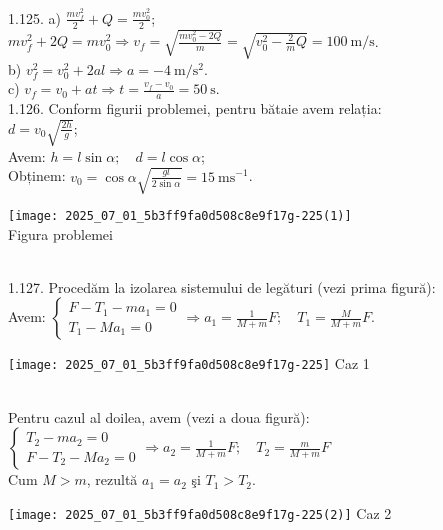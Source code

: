 1.125. a) $\frac{m v_{f}^{2}}{2}+Q=\frac{m v_{0}^{2}}{2}$;\\ $m v_{f}^{2}+2 Q=m v_{0}^{2} \Rightarrow v_{f}=\sqrt{\frac{m v_{0}^{2}-2 Q}{m}}=\sqrt{v_{0}^{2}-\frac{2}{m} Q}=100 \mathrm{~m} / \mathrm{s}$.\\ b) $v_{f}^{2}=v_{0}^{2}+2 a l \Rightarrow a=-4 \mathrm{~m} / \mathrm{s}^{2}$.\\ c) $v_{f}=v_{0}+a t \Rightarrow t=\frac{v_{f}-v_{0}}{a}=50 \mathrm{~s}$.\\

1.126. Conform figurii problemei, pentru bătaie avem relația:\\ $d=v_{0} \sqrt{\frac{2 h}{g}}$;\\ Avem: $h=l \sin \alpha; \quad d=l \cos \alpha$;\\ Obținem: $v_{0}=\cos \alpha \sqrt{\frac{g l}{2 \sin \alpha}}=15 \mathrm{~ms}^{-1}$.\\ \begin{center} \texttt{[image: 2025\_07\_01\_5b3ff9fa0d508c8e9f17g-225(1)]}\\ Figura problemei \end{center}\\

1.127. Procedăm la izolarea sistemului de legături (vezi prima figură):\\ Avem: $\left\{\begin{array}{l}F-T_{1}-m a_{1}=0 \\ T_{1}-M a_{1}=0\end{array} \Rightarrow a_{1}=\frac{1}{M+m} F; \quad T_{1}=\frac{M}{M+m} F\right.$.\\ \begin{center} \texttt{[image: 2025\_07\_01\_5b3ff9fa0d508c8e9f17g-225]} Caz 1 \end{center}\\ Pentru cazul al doilea, avem (vezi a doua figură):\\ $\left\{\begin{array}{l}T_{2}-m a_{2}=0 \\ F-T_{2}-M a_{2}=0\end{array} \Rightarrow a_{2}=\frac{1}{M+m} F; \quad T_{2}=\frac{m}{M+m} F\right.$\\ Cum $M>m$, rezultă $a_{1}=a_{2}$ şi $T_{1}>T_{2}$.\\ \begin{center} \texttt{[image: 2025\_07\_01\_5b3ff9fa0d508c8e9f17g-225(2)]} Caz 2 \end{center}\\


